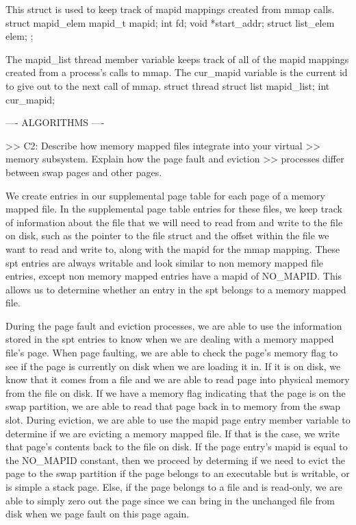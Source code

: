 This struct is used to keep track of mapid mappings created from mmap calls.
    struct mapid_elem
    {
        mapid_t mapid;
        int fd;
        void *start_addr;
        struct list_elem elem;
    };

The mapid_list thread member variable keeps track of all of the mapid mappings
created from a process's calls to mmap. The cur_mapid variable is the current
id to give out to the next call of mmap.
    struct thread
    {
       struct list mapid_list; 
       int cur_mapid; 
    }

---- ALGORITHMS ----

>> C2: Describe how memory mapped files integrate into your virtual
>> memory subsystem.  Explain how the page fault and eviction
>> processes differ between swap pages and other pages.

We create entries in our supplemental page table for each page of a memory
mapped file. In the supplemental page table entries for these files,
we keep track of information about the file that we will need to
read from and write to the file on disk, such as the pointer to the file
struct and the offset within the file we want to read and write to, along
with the mapid for the mmap mapping. These spt entries are always writable
and look similar to non memory mapped file entries, except non memory mapped
entries have a mapid of NO_MAPID. This allows us to determine whether an 
entry in the spt belongs to a memory mapped file.

During the page fault and eviction processes, we are able to use the
information stored in the spt entries to know when we are dealing with
a memory mapped file's page. When page faulting, we are able to check the
page's memory flag to see if the page is currently on disk when we are
loading it in. If it is on disk, we know that it comes from a file and we
are able to read page into physical memory from the file on disk. If we
have a memory flag indicating that the page is on the swap partition, we
are able to read that page back in to memory from the swap slot. During 
eviction, we are able to use the mapid page entry member variable to
determine if we are evicting a memory mapped file. If that is the case,
we write that page's contents back to the file on disk. If the page entry's
mapid is equal to the NO_MAPID constant, then we proceed by determing if
we need to evict the page to the swap partition if the page belongs to an
executable but is writable, or is simple a stack page. Else, if the page
belongs to a file and is read-only, we are able to simply zero out the page
since we can bring in the unchanged file from disk when we page fault on
this page again.

